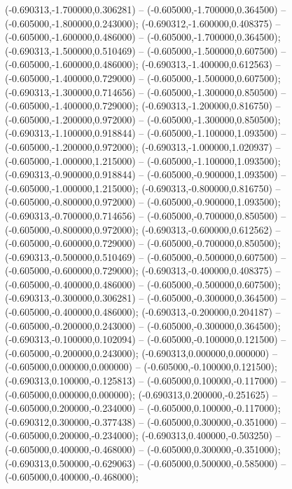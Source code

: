  (-0.690313,-1.700000,0.306281) -- (-0.605000,-1.700000,0.364500) -- (-0.605000,-1.800000,0.243000);
 (-0.690312,-1.600000,0.408375) -- (-0.605000,-1.600000,0.486000) -- (-0.605000,-1.700000,0.364500);
 (-0.690313,-1.500000,0.510469) -- (-0.605000,-1.500000,0.607500) -- (-0.605000,-1.600000,0.486000);
 (-0.690313,-1.400000,0.612563) -- (-0.605000,-1.400000,0.729000) -- (-0.605000,-1.500000,0.607500);
 (-0.690313,-1.300000,0.714656) -- (-0.605000,-1.300000,0.850500) -- (-0.605000,-1.400000,0.729000);
 (-0.690313,-1.200000,0.816750) -- (-0.605000,-1.200000,0.972000) -- (-0.605000,-1.300000,0.850500);
 (-0.690313,-1.100000,0.918844) -- (-0.605000,-1.100000,1.093500) -- (-0.605000,-1.200000,0.972000);
 (-0.690313,-1.000000,1.020937) -- (-0.605000,-1.000000,1.215000) -- (-0.605000,-1.100000,1.093500);
 (-0.690313,-0.900000,0.918844) -- (-0.605000,-0.900000,1.093500) -- (-0.605000,-1.000000,1.215000);
 (-0.690313,-0.800000,0.816750) -- (-0.605000,-0.800000,0.972000) -- (-0.605000,-0.900000,1.093500);
 (-0.690313,-0.700000,0.714656) -- (-0.605000,-0.700000,0.850500) -- (-0.605000,-0.800000,0.972000);
 (-0.690313,-0.600000,0.612562) -- (-0.605000,-0.600000,0.729000) -- (-0.605000,-0.700000,0.850500);
 (-0.690313,-0.500000,0.510469) -- (-0.605000,-0.500000,0.607500) -- (-0.605000,-0.600000,0.729000);
 (-0.690313,-0.400000,0.408375) -- (-0.605000,-0.400000,0.486000) -- (-0.605000,-0.500000,0.607500);
 (-0.690313,-0.300000,0.306281) -- (-0.605000,-0.300000,0.364500) -- (-0.605000,-0.400000,0.486000);
 (-0.690313,-0.200000,0.204187) -- (-0.605000,-0.200000,0.243000) -- (-0.605000,-0.300000,0.364500);
 (-0.690313,-0.100000,0.102094) -- (-0.605000,-0.100000,0.121500) -- (-0.605000,-0.200000,0.243000);
 (-0.690313,0.000000,0.000000) -- (-0.605000,0.000000,0.000000) -- (-0.605000,-0.100000,0.121500);
 (-0.690313,0.100000,-0.125813) -- (-0.605000,0.100000,-0.117000) -- (-0.605000,0.000000,0.000000);
 (-0.690313,0.200000,-0.251625) -- (-0.605000,0.200000,-0.234000) -- (-0.605000,0.100000,-0.117000);
 (-0.690312,0.300000,-0.377438) -- (-0.605000,0.300000,-0.351000) -- (-0.605000,0.200000,-0.234000);
 (-0.690313,0.400000,-0.503250) -- (-0.605000,0.400000,-0.468000) -- (-0.605000,0.300000,-0.351000);
 (-0.690313,0.500000,-0.629063) -- (-0.605000,0.500000,-0.585000) -- (-0.605000,0.400000,-0.468000);
